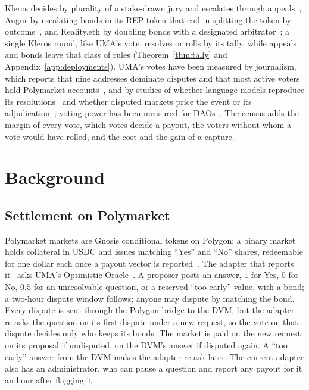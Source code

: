 \documentclass[conference,compsoc]{IEEEtran}
\makeatletter
\renewcommand\paragraph{\@startsection{paragraph}{4}{2\parindent}{0ex plus 0.1ex minus 0.1ex}{0ex}{\normalfont\normalsize\itshape}}
\makeatother
\begin{document}
\paragraph{Other resolution designs}
 Kleros decides by plurality of a stake-drawn jury and escalates through appeals~\cite{klerosdocs,kleros2021}, Augur by escalating bonds in its REP token that end in splitting the token by outcome~\cite{augur2019}, and Reality.eth by doubling bonds with a designated arbitrator~\cite{realitio}; a single Kleros round, like UMA's vote, resolves or rolls by its tally, while appeals and bonds leave that class of rules (Theorem~\ref{thm:tally} and Appendix~\ref{app:deployments}). UMA's votes have been measured by journalism, which reports that nine addresses dominate disputes and that most active voters hold Polymarket accounts~\cite{defiant2025,cryptonews2025,wsj2026,financemagnates2026,cryptobriefing2026}, and by studies of whether language models reproduce its resolutions~\cite{llmarbitration2026} and whether disputed markets price the event or its adjudication~\cite{wang2026}; voting power has been measured for DAOs~\cite{fritsch2024}. The census adds the margin of every vote, which votes decide a payout, the voters without whom a vote would have rolled, and the cost and the gain of a capture.

\section{Background}
\label{sec:background}

\subsection{Settlement on Polymarket}
 Polymarket markets are Gnosis conditional tokens on Polygon: a binary market holds collateral in USDC and issues matching ``Yes'' and ``No'' shares, redeemable for one dollar each once a payout vector is reported~\cite{gnosisctf}. The adapter that reports it~\cite{polymarketadapter} asks UMA's Optimistic Oracle~\cite{umadvm2}. A proposer posts an answer, $1$ for Yes, $0$ for No, $0.5$ for an unresolvable question, or a reserved ``too early'' value, with a bond; a two-hour dispute window follows; anyone may dispute by matching the bond. Every dispute is sent through the Polygon bridge to the DVM, but the adapter re-asks the question on its first dispute under a new request, so the vote on that dispute decides only who keeps its bonds. The market is paid on the new request: on its proposal if undisputed, on the DVM's answer if disputed again. A ``too early'' answer from the DVM makes the adapter re-ask later. The current adapter also has an administrator, who can pause a question and report any payout for it an hour after flagging it.
\end{document}
